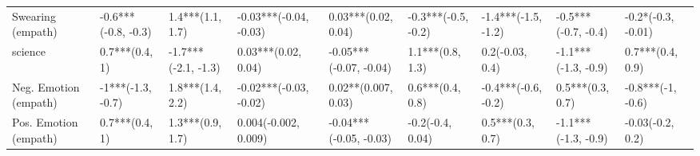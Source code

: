 \begin{table}[h]
\begin{adjustbox}{width=\linewidth, center}
\begin{tabular}{lllllllll}
	Swearing (empath)     &  -0.6***(-0.8, -0.3) &     1.4***(1.1, 1.7) &   -0.03***(-0.04, -0.03) &     0.03***(0.02, 0.04) &  -0.3***(-0.5, -0.2) &  -1.4***(-1.5, -1.2) &  -0.5***(-0.7, -0.4) &   -0.2*(-0.3, -0.01) \\
	science               &       0.7***(0.4, 1) &  -1.7***(-2.1, -1.3) &      0.03***(0.02, 0.04) &  -0.05***(-0.07, -0.04) &     1.1***(0.8, 1.3) &      0.2(-0.03, 0.4) &  -1.1***(-1.3, -0.9) &     0.7***(0.4, 0.9) \\
	Neg. Emotion (empath) &    -1***(-1.3, -0.7) &     1.8***(1.4, 2.2) &   -0.02***(-0.03, -0.02) &     0.02**(0.007, 0.03) &     0.6***(0.4, 0.8) &  -0.4***(-0.6, -0.2) &     0.5***(0.3, 0.7) &    -0.8***(-1, -0.6) \\
	Pos. Emotion (empath) &       0.7***(0.4, 1) &     1.3***(0.9, 1.7) &     0.004(-0.002, 0.009) &  -0.04***(-0.05, -0.03) &     -0.2(-0.4, 0.04) &     0.5***(0.3, 0.7) &  -1.1***(-1.3, -0.9) &     -0.03(-0.2, 0.2) \\
	\bottomrule
	\end{tabular}
	
\end{adjustbox}
	\end{table}

